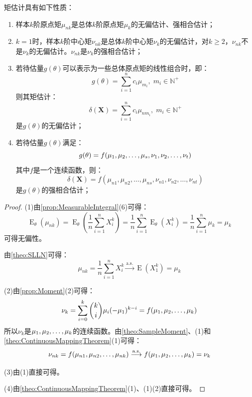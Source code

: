 \begin{property}\label{prop:MomentEstimation}
	矩估计具有如下性质：
	\begin{enumerate}
		\item 样本$k$阶原点矩$\mu_{nk}$是总体$k$阶原点矩$\mu_k$的无偏估计、强相合估计；
		\item $k=1$时，样本$k$阶中心矩$\nu_{nk}$是总体$k$阶中心矩$\nu_k$的无偏估计，对$k\geqslant2$，$\nu_{nk}$不是$\nu_k$的无偏估计。$\nu_{nk}$是$\nu_k$的强相合估计；
		\item 若待估量$g(\theta)$可以表示为一些总体原点矩的线性组合时，即：
		\begin{equation*}
			g(\theta)=\sum_{i=1}^{n}c_i\mu_{m_i},\;m_i\in\mathbb{N}^+
		\end{equation*}
		则其矩估计：
		\begin{equation*}
			\delta(\mathbf{X})=\sum_{i=1}^{n}c_i\mu_{nm_i},\;m_i\in\mathbb{N}^+
		\end{equation*}
		是$g(\theta)$的无偏估计；
		\item 若待估量$g(\theta)$满足：
		\begin{equation*}
			g(\theta)=f(\mu_1, \mu_2, \dots, \mu_{s},\nu_1, \nu_2, \dots, \nu_{t})
		\end{equation*}
		其中$f$是一个连续函数，则：
		\begin{equation*}
			\delta(\mathbf{X})=f(\mu_{n1},\mu_{n2},\dots,\mu_{ns},\nu_{n1},\nu_{n2},\dots,\nu_{nt})
		\end{equation*}
		是$g(\theta)$的强相合估计；
	\end{enumerate}
\end{property}
\begin{proof}
	(1)由\cref{prop:MeasurableIntegral}(6)可得：
	\begin{equation*}
		\operatorname{E}_{\theta}(\mu_{nk})=\operatorname{E}_{\theta}\left(\frac{1}{n}\sum_{i=1}^{n}X_i^k\right)=\frac{1}{n}\sum_{i=1}^{n}\operatorname{E}_{\theta}(X_i^k)=\frac{1}{n}\sum_{i=1}^{n}\mu_k=\mu_k
	\end{equation*}
	可得无偏性。\par
	由\cref{theo:SLLN}可得：
	\begin{equation*}
		\mu_{nk}=\frac{1}{n}\sum_{i=1}^{n}X_i^k\overset{\text{a.s.}}{\longrightarrow}\operatorname{E}(X_1^k)=\mu_k
	\end{equation*}\par
	(2)由\cref{prop:Moment}(2)可得：
	\begin{equation*}
		\nu_k=\sum_{i=0}^{k}\binom{k}{i}\mu_i(-\mu_1)^{k-i}=f(\mu_1, \mu_2, \dots, \mu_{k})
	\end{equation*}
	所以$\nu_k$是$\mu_1, \mu_2, \dots, \mu_{k}$的连续函数。由\cref{theo:SampleMoment}、(1)和\cref{theo:ContinuousMappingTheorem}(1)可得：
	\begin{equation*}
		\nu_{nk}=f(\mu_{n1},\mu_{n2},\dots,\mu_{nk})\overset{\text{a.s.}}{\longrightarrow}f(\mu_1, \mu_2, \dots, \mu_{k})=\nu_{k}
	\end{equation*}\par
	(3)由(1)直接可得。\par
	(4)由\cref{theo:ContinuousMappingTheorem}(1)、(1)(2)直接可得。
\end{proof}
